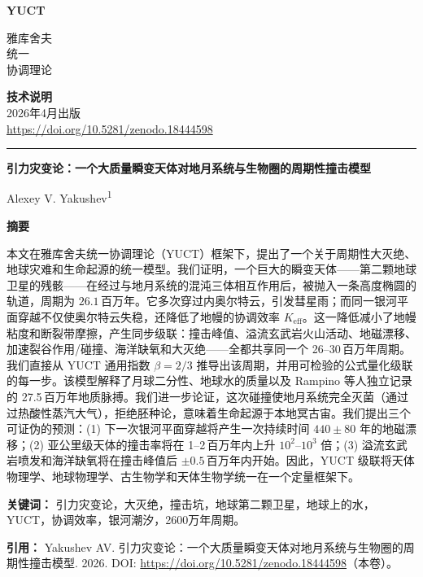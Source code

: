 \documentclass[11pt,a4paper]{article}
\newcommand{\makeheader}{%
	\noindent
	\begin{minipage}{0.17\textwidth}
		\raggedright
		{\sffamily\bfseries\color{skyblue}\fontsize{46}{46}\selectfont YUCT}%
	\end{minipage}%
	\hspace{30pt}
	\begin{minipage}{0.32\textwidth}
		\raggedright
		{\sffamily\fontsize{11}{13}\selectfont 雅库舍夫\\ 统一\\ 协调理论}%
	\end{minipage}%
	\hfill
	\begin{minipage}{0.38\textwidth}
		\raggedleft
		{\sffamily\bfseries 技术说明}\\
		{\sffamily 2026年4月出版}\\
		{\sffamily\footnotesize \scriptsize\url{https://doi.org/10.5281/zenodo.18444598}}%
	\end{minipage}
	\par\vspace{5pt}
	\noindent\textcolor{gold}{\rule{\textwidth}{1.6pt}}
	\par\vspace{0pt}
}
\begin{document}
	\thispagestyle{firstpage}
	\makeheader
	
	\vspace{0cm}
	{\LARGE\bfseries 引力灾变论：一个大质量瞬变天体对地月系统与生物圈的周期性撞击模型 \par}
	\vspace{0.2cm}
	
	{\large Alexey V. Yakushev\textsuperscript{1}} \\
	\vspace{0.0cm}
	
	{\color{darkblue}\textbf{\LARGE 摘要}} \par
	{\large
		\noindent
		本文在雅库舍夫统一协调理论（YUCT）框架下，提出了一个关于周期性大灭绝、地球灾难和生命起源的统一模型。我们证明，一个巨大的瞬变天体——第二颗地球卫星的残骸——在经过与地月系统的混沌三体相互作用后，被抛入一条高度椭圆的轨道，周期为 \(26.1\) 百万年。它多次穿过内奥尔特云，引发彗星雨；而同一银河平面穿越不仅使奥尔特云失稳，还降低了地幔的协调效率 \(K_{\mathrm{eff}}\)。这一降低减小了地幔粘度和断裂带摩擦，产生同步级联：撞击峰值、溢流玄武岩火山活动、地磁漂移、加速裂谷作用/碰撞、海洋缺氧和大灭绝——全都共享同一个 26–30 百万年周期。我们直接从 YUCT 通用指数 \(\beta = 2/3\) 推导出该周期，并用可检验的公式量化级联的每一步。该模型解释了月球二分性、地球水的质量以及 Rampino 等人独立记录的 27.5 百万年地质脉搏。我们进一步论证，这次碰撞使地月系统完全灭菌（通过过热酸性蒸汽大气），拒绝胚种论，意味着生命起源于本地冥古宙。我们提出三个可证伪的预测：(1) 下一次银河平面穿越将产生一次持续时间 \(440 \pm 80\) 年的地磁漂移；(2) 亚公里级天体的撞击率将在 1–2 百万年内上升 \(10^{2}\)–\(10^{3}\) 倍；(3) 溢流玄武岩喷发和海洋缺氧将在撞击峰值后 \(\pm 0.5\) 百万年内开始。因此，YUCT 级联将天体物理学、地球物理学、古生物学和天体生物学统一在一个定量框架下。}
	
	\vspace{0.1cm}
	\noindent
	{\color{darkblue}\textbf{关键词：}} 引力灾变论，大灭绝，撞击坑，地球第二颗卫星，地球上的水，YUCT，协调效率，银河潮汐，2600万年周期。
	
	\vspace{0.1cm}
	\noindent
	{\color{darkblue}\textbf{引用：}} Yakushev AV. 引力灾变论：一个大质量瞬变天体对地月系统与生物圈的周期性撞击模型. 2026. DOI: \url{https://doi.org/10.5281/zenodo.18444598}（本卷）。
	
	\vspace{0.4cm}
	
\end{document}
